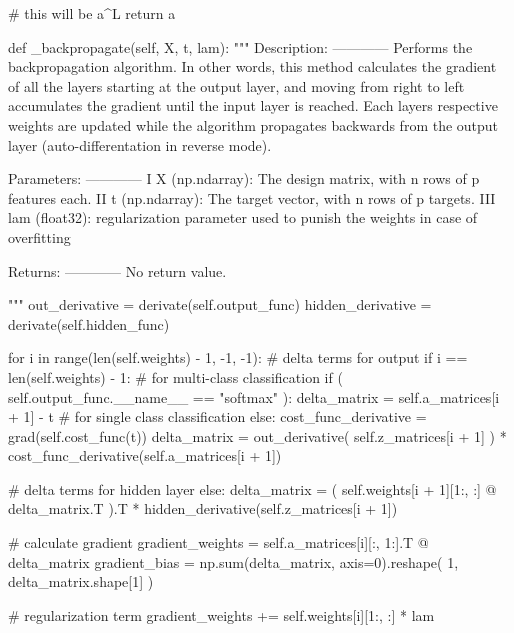 \documentclass[%
oneside,                 %
final,                   %
10pt]{article}
\begin{document}
        # this will be a^L
        return a

    def _backpropagate(self, X, t, lam):
        """
        Description:
        ------------
            Performs the backpropagation algorithm. In other words, this method
            calculates the gradient of all the layers starting at the
            output layer, and moving from right to left accumulates the gradient until
            the input layer is reached. Each layers respective weights are updated while
            the algorithm propagates backwards from the output layer (auto-differentation in reverse mode).

        Parameters:
        ------------
            I   X (np.ndarray): The design matrix, with n rows of p features each.
            II  t (np.ndarray): The target vector, with n rows of p targets.
            III lam (float32): regularization parameter used to punish the weights in case of overfitting

        Returns:
        ------------
            No return value.

        """
        out_derivative = derivate(self.output_func)
        hidden_derivative = derivate(self.hidden_func)

        for i in range(len(self.weights) - 1, -1, -1):
            # delta terms for output
            if i == len(self.weights) - 1:
                # for multi-class classification
                if (
                    self.output_func.__name__ == "softmax"
                ):
                    delta_matrix = self.a_matrices[i + 1] - t
                # for single class classification
                else:
                    cost_func_derivative = grad(self.cost_func(t))
                    delta_matrix = out_derivative(
                        self.z_matrices[i + 1]
                    ) * cost_func_derivative(self.a_matrices[i + 1])

            # delta terms for hidden layer
            else:
                delta_matrix = (
                    self.weights[i + 1][1:, :] @ delta_matrix.T
                ).T * hidden_derivative(self.z_matrices[i + 1])

            # calculate gradient
            gradient_weights = self.a_matrices[i][:, 1:].T @ delta_matrix
            gradient_bias = np.sum(delta_matrix, axis=0).reshape(
                1, delta_matrix.shape[1]
            )

            # regularization term
            gradient_weights += self.weights[i][1:, :] * lam
\end{document}
